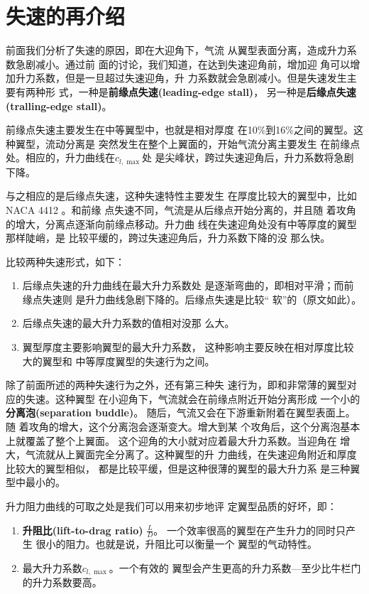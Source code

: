 \section{失速的再介绍}
前面我们分析了失速的原因，即在大迎角下，气流
从翼型表面分离，造成升力系数急剧减小。通过前
面的讨论，我们知道，在达到失速迎角前，增加迎
角可以增加升力系数，但是一旦超过失速迎角，升
力系数就会急剧减小。但是失速发生主要有两种形
式，一种是{\bfseries 前缘点失速(leading-edge stall)}，
另一种是{\bfseries 后缘点失速(tralling-edge stall)}。

前缘点失速主要发生在中等翼型中，也就是相对厚度
在10\%到16\%之间的翼型。这种翼型，流动分离是
突然发生在整个上翼面的，开始气流分离主要发生
在前缘点处。相应的，升力曲线在$c_{l,\max}$处
是尖峰状，跨过失速迎角后，升力系数将急剧下降。

与之相应的是后缘点失速，这种失速特性主要发生
在厚度比较大的翼型中，比如NACA 4412 。和前缘
点失速不同，气流是从后缘点开始分离的，并且随
着攻角的增大，分离点逐渐向前缘点移动。升力曲
线在失速迎角处没有中等厚度的翼型那样陡峭，是
比较平缓的，跨过失速迎角后，升力系数下降的没
那么快。

比较两种失速形式，如下：
\begin{enumerate}
  \item 后缘点失速的升力曲线在最大升力系数处
    是逐渐弯曲的，即相对平滑；而前缘点失速则
    是升力曲线急剧下降的。后缘点失速是比较“
    软”的（原文如此）。
  \item 后缘点失速的最大升力系数的值相对没那
    么大。
  \item 翼型厚度主要影响翼型的最大升力系数，
    这种影响主要反映在相对厚度比较大的翼型和
    中等厚度翼型的失速行为之间。
\end{enumerate}

除了前面所述的两种失速行为之外，还有第三种失
速行为，即和非常薄的翼型对应的失速。这种翼型
在小迎角下，气流就会在前缘点附近开始分离形成
一个小的{\bfseries 分离泡(separation buddle)}。
随后，气流又会在下游重新附着在翼型表面上。随
着攻角的增大，这个分离泡会逐渐变大。增大到某
个攻角后，这个分离泡基本上就覆盖了整个上翼面。
这个迎角的大小就对应着最大升力系数。当迎角在
增大，气流就从上翼面完全分离了。这种翼型的升
力曲线，在失速迎角附近和厚度比较大的翼型相似，
都是比较平缓，但是这种很薄的翼型的最大升力系
是三种翼型中最小的。

升力阻力曲线的可取之处是我们可以用来初步地评
定翼型品质的好坏，即：
\begin{enumerate}
  \item {\bfseries 升阻比(lift-to-drag ratio)}
    $\frac{L}{D }$。
    一个效率很高的翼型在产生升力的同时只产生
    很小的阻力。也就是说，升阻比可以衡量一个
    翼型的气动特性。
  \item 最大升力系数$c_{l,\max}$。一个有效的
    翼型会产生更高的升力系数---至少比牛栏门
    的升力系数要高。
\end{enumerate}


